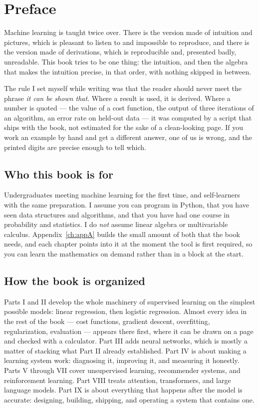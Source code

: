 
\chapter*{Preface}

Machine learning is taught twice over. There is the version made of intuition and
pictures, which is pleasant to listen to and impossible to reproduce, and there is
the version made of derivations, which is reproducible and, presented badly,
unreadable. This book tries to be one thing: the intuition, and then the algebra
that makes the intuition precise, in that order, with nothing skipped in between.

The rule I set myself while writing was that the reader should never meet the
phrase \emph{it can be shown that}. Where a result is used, it is derived. Where a
number is quoted --- the value of a cost function, the output of three iterations
of an algorithm, an error rate on held-out data --- it was computed by a script
that ships with the book, not estimated for the sake of a clean-looking page. If
you work an example by hand and get a different answer, one of us is wrong, and
the printed digits are precise enough to tell which.

\section*{Who this book is for}

Undergraduates meeting machine learning for the first time, and self-learners with
the same preparation. I assume you can program in Python, that you have seen data
structures and algorithms, and that you have had one course in probability and
statistics. I do \emph{not} assume linear algebra or multivariable calculus.
Appendix~\ref{ch:appA} builds the small amount of both that the book needs, and
each chapter points into it at the moment the tool is first required, so you can
learn the mathematics on demand rather than in a block at the start.

\section*{How the book is organized}

Parts I and II develop the whole machinery of supervised learning on the simplest
possible models: linear regression, then logistic regression. Almost every idea in
the rest of the book --- cost functions, gradient descent, overfitting,
regularization, evaluation --- appears there first, where it can be drawn on a
page and checked with a calculator. Part III adds neural networks, which is
mostly a matter of stacking what Part II already established. Part IV is about
making a learning system work: diagnosing it, improving it, and measuring it
honestly. Parts V through VII cover unsupervised learning, recommender systems,
and reinforcement learning. Part VIII treats attention, transformers, and large
language models. Part IX is about everything that happens after the model is
accurate: designing, building, shipping, and operating a system that contains one.

